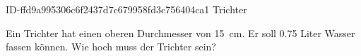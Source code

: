 \begin{exercise}
      {ID-ffd9a995306c6f2437d7c679958fd3c756404ca1}
      {Trichter}
  \ifproblem\problem\par
    Ein Trichter hat einen oberen Durchmesser von
    \SI{15}{\centi\metre}.
    Er soll \num{0.75} Liter Wasser fassen können.
    Wie hoch muss der Trichter sein?
  \fi
\end{exercise}
